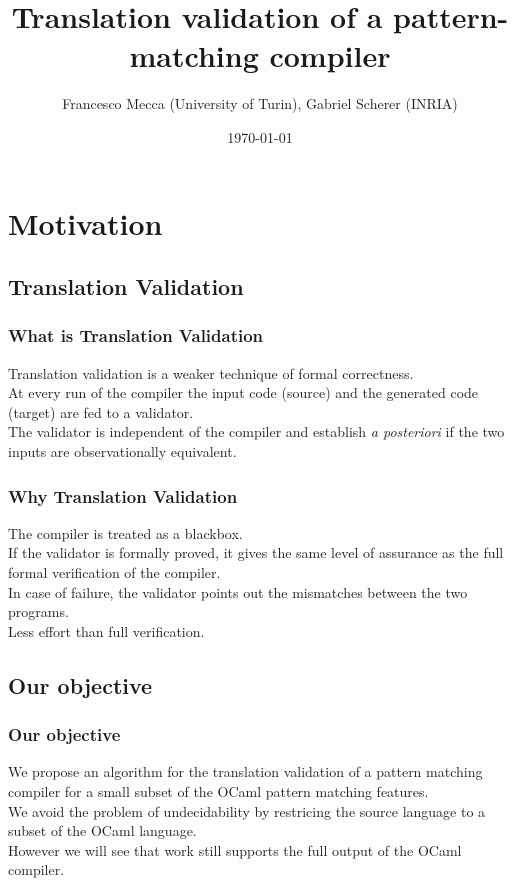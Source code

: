 \documentclass{beamer}
\title{Translation validation of a pattern-matching compiler}
\subtitle{}
\author{Francesco Mecca (University of Turin), Gabriel Scherer (INRIA)}
\date{\today}
\begin{document}

\begin{frame}
  \titlepage
\end{frame}

\section{Motivation}
\subsection{Translation Validation}

\begin{frame}
  \frametitle{What is Translation Validation}
  Translation validation is a  weaker technique of formal correctness. \\
  At every run of the compiler the input code (source) and the generated code (target) are fed to a
  validator. \\
  The validator is independent of the compiler and establish
  \emph{a posteriori} if the two inputs are observationally
  equivalent.
\end{frame}
\begin{frame}
  \frametitle{Why Translation Validation}
  The compiler is treated as a blackbox. \\
  If the validator is formally proved, it gives the same level of
  assurance as the full formal verification of the compiler. \\
  In case of failure, the validator points out the mismatches between
  the two programs. \\
  Less effort than full verification.
\end{frame}

\subsection{Our objective}
\begin{frame}
  \frametitle{Our objective}
  We propose an algorithm for the translation validation of a pattern
  matching compiler for a small subset of the OCaml pattern
  matching features. \\
  We avoid the problem of undecidability by restricing the source
  language to a subset of the OCaml language.\\
  However we will see that work still supports the full output of the
  OCaml compiler.
\end{frame}
\end{document}
